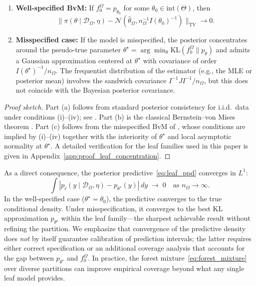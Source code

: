 \documentclass[twoside,11pt]{article}
\begin{document}
\begin{proposition}
\begin{enumerate}[label=(\alph*)]
    \item \textbf{Well-specified BvM:} If $f_0^\Omega = p_{\theta_0}$ for some $\theta_0 \in \mathrm{int}(\Theta)$, then
    \[
    \|\pi(\theta \mid \mathcal{D}_\Omega, \eta) - \mathcal{N}(\hat{\theta}_\Omega, n_\Omega^{-1} I(\theta_0)^{-1})\|_{\mathrm{TV}} \to 0.
    \]

    \item \textbf{Misspecified case:} If the model is misspecified, the posterior concentrates around the pseudo-true parameter $\theta^\star = \arg\min_\theta \mathrm{KL}(f_0^\Omega \| p_\theta)$ and admits a Gaussian approximation centered at $\theta^\star$ with covariance of order $I(\theta^\star)^{-1}/n_\Omega$. The frequentist distribution of the estimator (e.g., the MLE or posterior mean) involves the sandwich covariance $I^{-1} J I^{-1}/n_\Omega$, but this does not coincide with the Bayesian posterior covariance.
\end{enumerate}

\end{proposition}

\begin{proof}[Proof sketch]
Part (a) follows from standard posterior consistency for i.i.d.\ data under conditions (i)--(iv); see \citet[Theorem~2.1]{ghosh2003bayesian}. Part (b) is the classical Bernstein--von Mises theorem \citep[Theorem~10.1]{van2000asymptotic}. Part (c) follows from the misspecified BvM of \citet[Theorem~2.1]{kleijn2012bernstein}, whose conditions are implied by (i)--(iv) together with the interiority of $\theta^\star$ and local asymptotic normality at $\theta^\star$. A detailed verification for the leaf families used in this paper is given in Appendix~\ref{app:proof_leaf_concentration}.
\end{proof}

As a direct consequence, the posterior predictive~\eqref{eq:leaf_ppd} converges in $L^1$:
\begin{equation}\label{eq:ppd_convergence}
\int |p_\ell(y \mid \mathcal{D}_\Omega, \eta) - p_{\theta^\star}(y)|\,dy \;\to\; 0 \quad \text{as } n_\Omega \to \infty.
\end{equation}
In the well-specified case ($\theta^\star = \theta_0$), the predictive converges to the true conditional density. Under misspecification, it converges to the best KL approximation $p_{\theta^\star}$ within the leaf family---the sharpest achievable result without refining the partition. We emphasize that convergence of the predictive density does \emph{not} by itself guarantee calibration of prediction intervals; the latter requires either correct specification or an additional coverage analysis that accounts for the gap between $p_{\theta^\star}$ and $f_0^\Omega$. In practice, the forest mixture~\eqref{eq:forest_mixture} over diverse partitions can improve empirical coverage beyond what any single leaf model provides.
\end{document}

